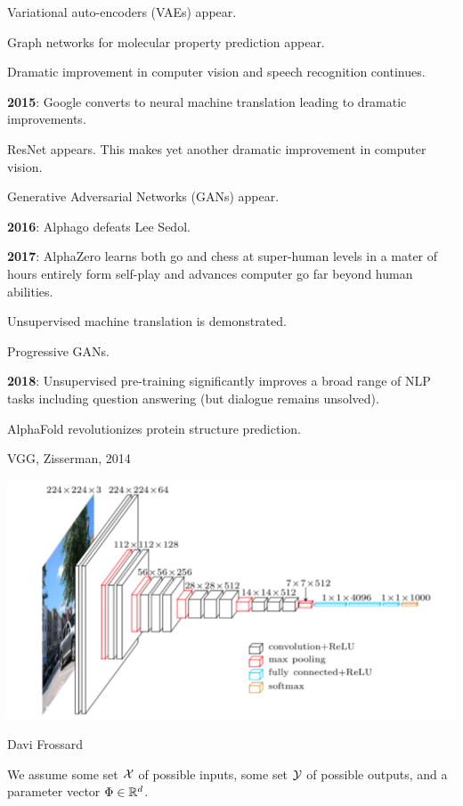 {\vfill
Variational auto-encoders (VAEs) appear.

\vfill
Graph networks for molecular property prediction appear.

\vfill
Dramatic improvement in computer vision and speech recognition continues.


{\bf 2015}: Google converts to neural machine translation leading to dramatic improvements.

\vfill
ResNet appears.  This makes yet another dramatic improvement in computer vision.

\vfill
Generative Adversarial Networks (GANs) appear.

\vfill
{\bf 2016}: Alphago defeats Lee Sedol.


{\bf 2017}: AlphaZero learns both go and chess at super-human levels in a mater of hours entirely form self-play and advances computer go far beyond human abilities.

\vfill
Unsupervised machine translation is demonstrated.

\vfill
Progressive GANs.

\vfill
{\bf 2018}: Unsupervised pre-training significantly improves a broad range of NLP tasks including question answering (but dialogue remains unsolved).

\vfill
AlphaFold revolutionizes protein structure prediction.

{VGG, Zisserman, 2014}

\centerline{\includegraphics[width = 8.0in]{../images/VGG}}
\centerline{\large Davi Frossard}


We assume some set ${\cal X}$ of possible inputs, some set ${\cal Y}$ of possible outputs,
and a parameter vector $\Phi \in \mathbb{R}^d$.

}
